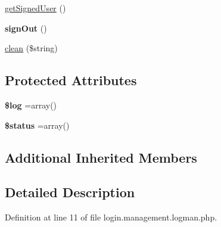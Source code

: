 \begin{DoxyCompactItemize}
\item 
\hyperlink{classlog_man_ae99d103123f211eb28e19c09f7fd134e}{get\-Signed\-User} ()
\item 
\hypertarget{classlog_man_af6b7cbde6eae6ee4d7825b1a9f202bf6}{{\bfseries sign\-Out} ()}\label{classlog_man_af6b7cbde6eae6ee4d7825b1a9f202bf6}

\item 
\hyperlink{classlog_man_aff5b25c460fba7b1bce3e2a36fe702cf}{clean} (\$string)
\end{DoxyCompactItemize}
\subsection*{Protected Attributes}
\begin{DoxyCompactItemize}
\item 
\hypertarget{classlog_man_a9a2cf15a653aee8be437f7ae474cd494}{{\bfseries \$log} =array()}\label{classlog_man_a9a2cf15a653aee8be437f7ae474cd494}

\item 
\hypertarget{classlog_man_a58391ea75f2d29d5d708d7050b641c33}{{\bfseries \$status} =array()}\label{classlog_man_a58391ea75f2d29d5d708d7050b641c33}

\end{DoxyCompactItemize}
\subsection*{Additional Inherited Members}


\subsection{Detailed Description}


Definition at line 11 of file login.\-management.\-logman.\-php.



